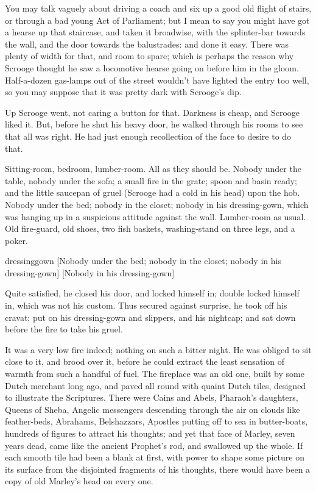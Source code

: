 You may talk vaguely about driving a coach and six up a good old flight of stairs, or through a bad young Act of Parliament; but I mean to say you might have got a hearse up that staircase, and taken it broad\-wise, with the splinter-bar towards the wall, and the door towards the balustrades: and done it easy. There was plenty of width for that, and room to spare; which is perhaps the reason why Scrooge thought he saw a locomotive hearse going on before him in the gloom. Half-a-dozen gas-lamps out of the street wouldn't have lighted the entry too well, so you may suppose that it was pretty dark with Scrooge's dip.

Up Scrooge went, not caring a button for that. Darkness is cheap, and Scrooge liked it. But, before he shut his heavy door, he walked through his rooms to see that all was right. He had just enough recollection of the face to desire to do that.

Sitting-room, bedroom, lumber-room. All as they should be. Nobody under the table, nobody under the sofa; a small fire in the grate; spoon and basin ready; and the little saucepan of gruel (Scrooge had a cold in his head) upon the hob. Nobody under the bed; nobody in the closet; nobody in his dressing-gown, which was hanging up in a suspicious attitude against the wall. Lumber-room as usual. Old fire-guard, old shoes, two fish baskets, washing-stand on three legs, and a poker.

\begin{colorbigpic}
	[\basicscale]
	{dressinggown}
	[Nobody under the bed; nobody in the closet; nobody in his dressing-gown]
	[Nobody in his dressing-gown]
\end{colorbigpic}

 
Quite satisfied, he closed his door, and locked himself in; double locked himself in, which was not his custom. Thus secured against surprise, he took off his cravat; put on his dressing-gown and slippers, and his nightcap; and sat down before the fire to take his gruel.

It was a very low fire indeed; nothing on such a bitter night. He was obliged to sit close to it, and brood over it, before he could extract the least sensation of warmth from such a handful of fuel. The fireplace was an old one, built by some Dutch merchant long ago, and paved all round with quaint Dutch tiles, designed to illustrate the Scriptures. There were Cains and Abels, Pharaoh's daughters, Queens of Sheba, Angelic messengers descending  through the air on clouds like feather-beds, Abrahams, Belshazzars, Apostles putting off to sea in butter-boats, hundreds of figures to attract his thoughts; and yet that face of Marley, seven years dead, came like the ancient Prophet's rod, and swallowed up the whole. If each smooth tile had been a blank at first, with power to shape some picture on its surface from the disjointed fragments of his thoughts, there would have been a copy of old Marley's head on every one.

